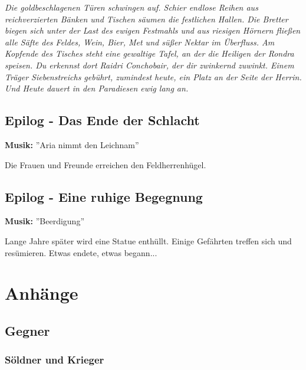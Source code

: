 \emph{Die goldbeschlagenen Türen schwingen auf. Schier endlose Reihen aus reichverzierten Bänken und Tischen säumen die festlichen Hallen. Die Bretter biegen sich unter der Last des ewigen Festmahls und aus riesigen Hörnern fließen alle Säfte des Feldes, Wein, Bier, Met und süßer Nektar im Überfluss. Am Kopfende des Tisches steht eine gewaltige Tafel, an der die Heiligen der Rondra speisen. Du erkennst dort Raidri Conchobair, der dir zwinkernd zuwinkt. Einem Träger Siebenstreichs gebührt, zumindest heute, ein Platz an der Seite der Herrin. Und Heute dauert in den Paradiesen ewig lang an.}

\subsection{Epilog - Das Ende der Schlacht}
\textbf{Musik:} ''Aria nimmt den Leichnam''
 

Die Frauen und Freunde erreichen den Feldherrenhügel.

\subsection{Epilog - Eine ruhige Begegnung}
\textbf{Musik:} ''Beerdigung''
 

Lange Jahre später wird eine Statue enthüllt. Einige Gefährten treffen sich und resümieren. Etwas endete, etwas begann...

\newpage

\section{Anhänge}

\subsection{Gegner}


\subsubsection{Söldner und Krieger}


